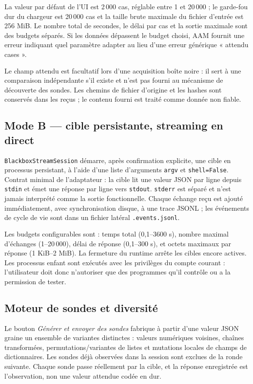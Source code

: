 \documentclass[11pt,a4paper]{article}
\begin{document}
La valeur par défaut de l'UI est 2\,000 cas, réglable entre 1 et 20\,000 ; le garde-fou dur du chargeur est 20\,000 cas et la taille brute maximale du fichier d'entrée est 256 MiB. Le nombre total de secondes, le délai par cas et la sortie maximale sont des budgets séparés. Si les données dépassent le budget choisi, AAM fournit une erreur indiquant quel paramètre adapter au lieu d'une erreur générique « attendu cases ».

Le champ attendu est facultatif lors d'une acquisition boîte noire : il sert à une comparaison indépendante s'il existe et n'est pas fourni au mécanisme de découverte des sondes. Les chemins de fichier d'origine et les hashes sont conservés dans les reçus ; le contenu fourni est traité comme donnée non fiable.

\subsection{Mode B — cible persistante, streaming en direct}
\verb|BlackboxStreamSession| démarre, après confirmation explicite, une cible en processus persistant, à l'aide d'une liste d'arguments \verb|argv| et \verb|shell=False|. Contrat minimal de l'adaptateur : la cible lit une valeur JSON par ligne depuis \verb|stdin| et émet une réponse par ligne vers \verb|stdout|. \verb|stderr| est séparé et n'est jamais interprété comme la sortie fonctionnelle. Chaque échange reçu est ajouté immédiatement, avec synchronisation disque, à une trace JSONL ; les événements de cycle de vie sont dans un fichier latéral \verb|.events.jsonl|.

Les budgets configurables sont : temps total (0,1–3600 s), nombre maximal d'échanges (1–20\,000), délai de réponse (0,1–300 s), et octets maximaux par réponse (1 KiB–2 MiB). La fermeture du runtime arrête les cibles encore actives. Les processus enfant sont exécutés avec les privilèges du compte courant : l'utilisateur doit donc n'autoriser que des programmes qu'il contrôle ou a la permission de tester.

\subsection{Moteur de sondes et diversité}
Le bouton \emph{Générer et envoyer des sondes} fabrique à partir d'une valeur JSON graine un ensemble de variantes distinctes : valeurs numériques voisines, chaînes transformées, permutations/variantes de listes et mutations locales de champs de dictionnaires. Les sondes déjà observées dans la session sont exclues de la ronde suivante. Chaque sonde passe réellement par la cible, et la réponse enregistrée est l'observation, non une valeur attendue codée en dur.
\end{document}
